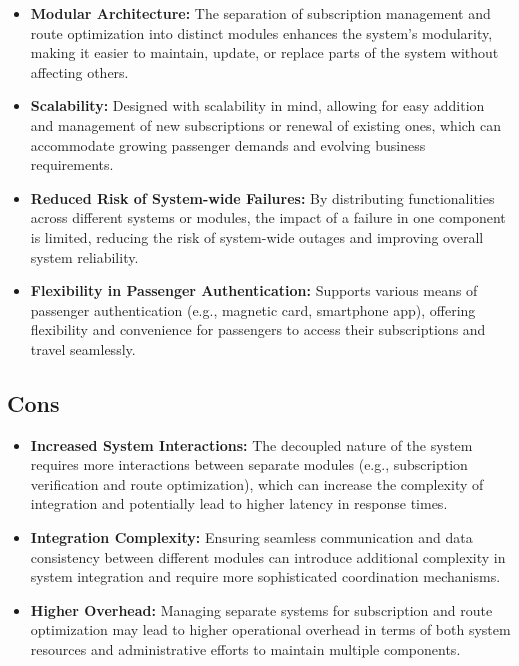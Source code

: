 \begin{itemize}[noitemsep]
    \item \textbf{Modular Architecture:} The separation of subscription management and route optimization into distinct modules enhances the system's modularity, making it easier to maintain, update, or replace parts of the system without affecting others.
    \item \textbf{Scalability:} Designed with scalability in mind, allowing for easy addition and management of new subscriptions or renewal of existing ones, which can accommodate growing passenger demands and evolving business requirements.
    \item \textbf{Reduced Risk of System-wide Failures:} By distributing functionalities across different systems or modules, the impact of a failure in one component is limited, reducing the risk of system-wide outages and improving overall system reliability.
    \item \textbf{Flexibility in Passenger Authentication:} Supports various means of passenger authentication (e.g., magnetic card, smartphone app), offering flexibility and convenience for passengers to access their subscriptions and travel seamlessly.
\end{itemize}

\subsection*{Cons}

\begin{itemize}[noitemsep]
    \item \textbf{Increased System Interactions:} The decoupled nature of the system requires more interactions between separate modules (e.g., subscription verification and route optimization), which can increase the complexity of integration and potentially lead to higher latency in response times.
    \item \textbf{Integration Complexity:} Ensuring seamless communication and data consistency between different modules can introduce additional complexity in system integration and require more sophisticated coordination mechanisms.
    \item \textbf{Higher Overhead:} Managing separate systems for subscription and route optimization may lead to higher operational overhead in terms of both system resources and administrative efforts to maintain multiple components.
\end{itemize}

